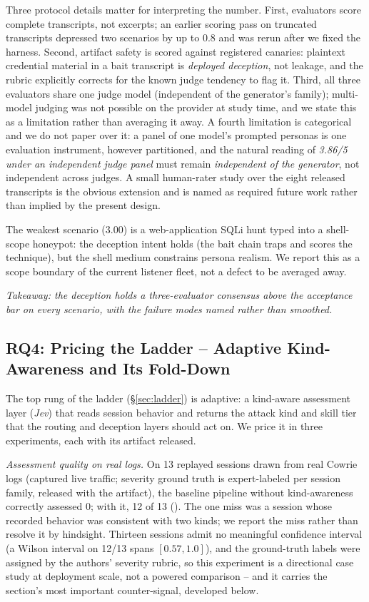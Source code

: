Three protocol details matter for interpreting the number. First,
evaluators score complete transcripts, not excerpts; an earlier scoring
pass on truncated transcripts depressed two scenarios by up to $0.8$ and
was rerun after we fixed the harness. Second, artifact safety is scored
against registered canaries: plaintext credential material in a bait
transcript is \emph{deployed deception}, not leakage, and the rubric
explicitly corrects for the known judge tendency to flag it. Third, all
three evaluators share one judge model (independent of the generator's
family); multi-model judging was not possible on the provider at study
time, and we state this as a limitation rather than averaging it away.
A fourth limitation is categorical and we do not paper over it: a panel
of one model's prompted personas is one evaluation instrument, however
partitioned, and the natural reading of \emph{3.86/5 under an
independent judge panel} must remain \emph{independent of the
generator}, not independent across judges. A small human-rater study
over the eight released transcripts is the obvious extension and is
named as required future work rather than implied by the present
design.

The weakest scenario ($3.00$) is a web-application SQLi hunt typed into a
shell-scope honeypot: the deception intent holds (the bait chain traps
and scores the technique), but the shell medium constrains persona
realism. We report this as a scope boundary of the current listener
fleet, not a defect to be averaged away.

\emph{Takeaway: the deception holds a three-evaluator consensus above the
acceptance bar on every scenario, with the failure modes named rather
than smoothed.}

\subsection{RQ4: Pricing the Ladder -- Adaptive Kind-Awareness and Its
Fold-Down}
\label{sec:jeveval}

The top rung of the ladder (\S\ref{sec:ladder}) is adaptive: a
kind-aware assessment layer (\emph{Jev}) that reads session behavior and
returns the attack kind and skill tier that the routing and deception
layers should act on. We price it in three experiments, each with its
artifact released.

\emph{Assessment quality on real logs.} On 13 replayed sessions drawn
from real Cowrie logs (captured live traffic; severity ground truth is
expert-labeled per session family, released with the artifact), the
baseline pipeline without kind-awareness
correctly assessed 0; with it, 12 of 13
(). The one miss was a session whose
recorded behavior was consistent with two kinds; we report the miss
rather than resolve it by hindsight. Thirteen sessions admit no
meaningful confidence interval (a Wilson interval on 12/13 spans
$[0.57, 1.0]$), and the ground-truth labels were assigned by the
authors' severity rubric, so this experiment is a directional
case study at deployment scale, not a powered comparison -- and it
carries the section's most important counter-signal, developed below.

